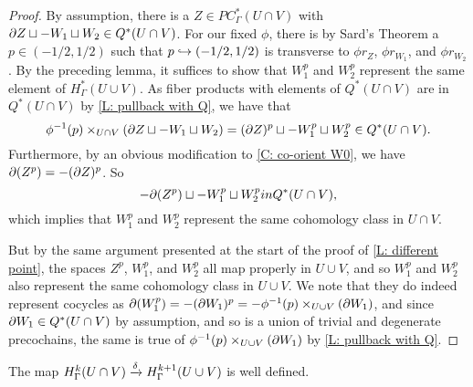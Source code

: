 \begin{proof}
	By assumption, there is a $Z \in PC^*_{\Gamma}(U \cap V)$ with $\partial Z \sqcup -W_1 \sqcup W_2 \in Q^*(U \cap V)$.
	For our fixed $\phi$, there is by Sard's Theorem a $p \in (-1/2,1/2)$ such that $p \hookrightarrow (-1/2,1/2)$ is transverse to $\phi r_Z$, $\phi r_{W_1}$, and $\phi r_{W_2}$.
	By the preceding lemma, it suffices to show that $W_1^p$ and $W_2^p$ represent the same element of $H^*_\Gamma(U \cup V)$.
	As fiber products with elements of $Q^*(U \cap V)$ are in $Q^*(U \cap V)$ by \cref{L: pullback with Q},
	we have that
	$$\phi^{-1}(p)\times_{U \cap V}(\partial Z \sqcup -W_1 \sqcup W_2) = (\partial Z)^p \sqcup -W_1^p \sqcup W_2^p \in Q^*(U \cap V).$$
	Furthermore, by an obvious modification to \cref{C: co-orient W0}, we have $\partial (Z^p) = -(\partial Z)^p$.
	So  $$-\partial (Z^p) \sqcup -W_1^p \sqcup W_2^p in Q^*(U \cap V),$$
	which implies that $W_1^p$ and $W_2^p$ represent the same cohomology class in $U \cap V$.

	But by the same argument presented at the start of the proof of \cref{L: different point}, the spaces $Z^p$, $W_1^p$, and $W_2^p$ all map properly in $U \cup V$, and so $W_1^p$ and $W_2^p$ also represent the same cohomology class in $U \cup V$.
	We note that they do indeed represent cocycles as $\partial (W_1^p) = - (\partial W_1)^p = -\phi^{-1}(p) \times_{U \cup V} (\partial W_1)$, and since $\partial W_1 \in Q^*(U \cap V)$ by assumption, and so is a union of trivial and degenerate precochains, the same is true of $\phi^{-1}(p) \times_{U \cup V} (\partial W_1)$ by \cref{L: pullback with Q}.
\end{proof}

\begin{proposition}\label{P: connecting}
	The map $H^k_\Gamma(U \cap V) \xrightarrow{\delta} H^{k+1}_\Gamma(U \cup V)$ is well defined.
\end{proposition}

